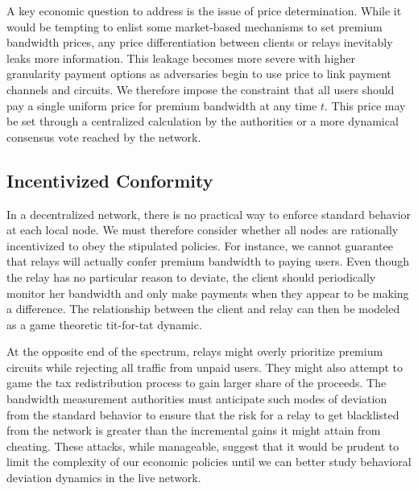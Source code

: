A key economic question to address is the issue of price determination. While it
would be tempting to enlist some market-based mechanisms to set premium
bandwidth prices, any price differentiation between clients or relays inevitably
leaks more information. This leakage becomes more severe with higher granularity
payment options as adversaries begin to use price to link payment channels and
circuits. We therefore impose the constraint that all users should pay a single
uniform price for premium bandwidth at any time $t$. This price may be set
through a centralized calculation by the authorities or a more dynamical
consensus vote reached by the network.

\subsection{Incentivized Conformity} In a decentralized network, there is no
practical way to enforce standard behavior at each local node. We must therefore
consider whether all nodes are rationally incentivized to obey the stipulated
policies. For instance, we cannot guarantee that relays will actually confer
premium bandwidth to paying users. Even though the relay has no particular
reason to deviate, the client should periodically monitor her bandwidth and only
make payments when they appear to be making a difference. The relationship
between the client and relay can then be modeled as a game theoretic tit-for-tat
dynamic.

At the opposite end of the spectrum, relays might overly prioritize premium
circuits while rejecting all traffic from unpaid users. They might also attempt
to game the tax redistribution process to gain larger share of the proceeds. The
bandwidth measurement authorities must anticipate such modes of deviation from
the standard behavior to ensure that the risk for a relay to get blacklisted
from the network is greater than the incremental gains it might attain from
cheating. These attacks, while manageable, suggest that it would be prudent to
limit the complexity of our economic policies until we can better study
behavioral deviation dynamics in the live network.

